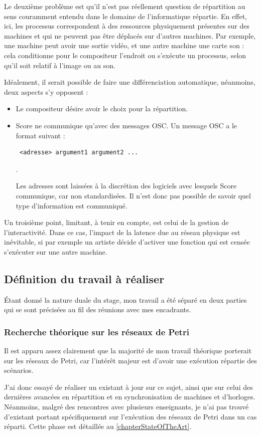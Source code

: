 Le deuxième problème est qu'il n'est pas réellement question de répartition au sens couramment entendu dans le domaine de l'informatique répartie. En effet, ici, les processus correspondent à des ressources physiquement présentes sur des machines et qui ne peuvent pas être déplacés sur d'autres machines. Par exemple, une machine peut avoir une sortie vidéo, et une autre machine une carte son : cela conditionne pour le compositeur l'endroit ou s'exécute un processus, selon qu'il soit relatif à l'image ou au son.

Idéalement, il serait possible de faire une différenciation automatique, néanmoins, deux aspects s'y opposent : 
\begin{itemize}
	\item Le compositeur désire avoir le choix pour la répartition.
	\item Score ne communique qu'avec des messages \ac{OSC}. Un message \ac{OSC} a le format suivant : 
	\begin{verbatim} <adresse> argument1 argument2 ... \end{verbatim}.
	
	Les adresses sont laissées à la discrétion des logiciels avec lesquels Score communique, car non standardisées. Il n'est donc pas possible de savoir quel type d'information est communiqué. 
\end{itemize}
Un troisième point, limitant, à tenir en compte, est celui de la gestion de l'interactivité. Dans ce cas, l'impact de la latence due au réseau physique est inévitable, si par exemple un artiste décide d'activer une fonction qui est censée s'exécuter sur une autre machine.


\subsection{Définition du travail à réaliser}
Étant donné la nature duale du stage, mon travail a été séparé en deux parties qui se sont précisées au fil des réunions avec mes encadrants.

\subsubsection{Recherche théorique sur les réseaux de Petri}
Il est apparu assez clairement que la majorité de mon travail théorique porterait sur les réseaux de Petri, car l'intérêt majeur est d'avoir une exécution répartie des scénarios.

J'ai donc essayé de réaliser un existant à jour sur ce sujet, ainsi que sur celui des dernières avancées en répartition et en synchronisation de machines et d'horloges.
Néanmoins, malgré des rencontres avec plusieurs enseignants, je n'ai pas trouvé d'existant portant spécifiquement sur l'exécution des réseaux de Petri dans un cas réparti.
Cette phase est détaillée au \cref{chapterStateOfTheArt}.

